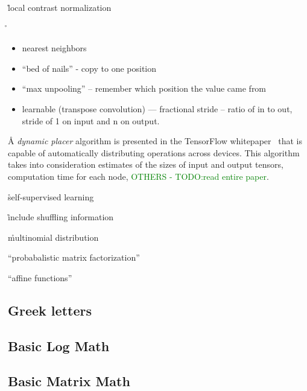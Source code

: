 \r{local contrast normalization}

\r{\begin{itemize}[noitemsep,topsep=0pt]
		\item nearest neighbors
		\item ``bed of nails'' - copy to one position
		\item ``max unpooling'' -- remember which position the value came from
		\item learnable (transpose convolution) --- fractional stride -- ratio of in to out, stride of 1 on input and n on output.
	\end{itemize}
}




\r{A \textit{dynamic placer} algorithm is presented in the {TensorFlow whitepaper}~\cite{abadi2016tensorflow_device_placement} that is capable of automatically distributing operations across devices. This algorithm takes into consideration  estimates of the sizes of input and output tensors, computation time for each node, \textcolor{green}{OTHERS - TODO:read entire paper}.}

\r{self-supervised learning}


\r{include shuffling information}

\r{multinomial distribution}

\r{``probabalistic matrix factorization''}

\r{``affine functions''}




\subsection{Greek letters}


\subsection{Basic Log Math}

\subsection{Basic Matrix Math}

